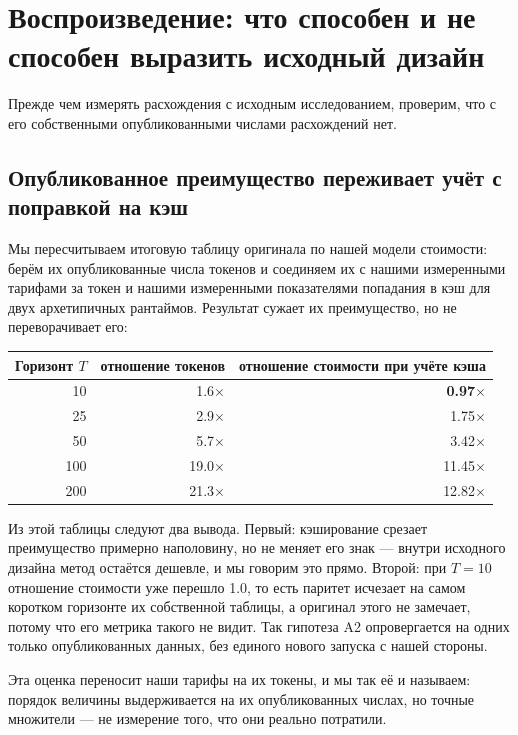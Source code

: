 \section{Воспроизведение: что способен и не способен выразить исходный дизайн}
\label{sec:repro}

Прежде чем измерять расхождения с исходным исследованием, проверим, что с
его собственными опубликованными числами расхождений нет.

\subsection{Опубликованное преимущество переживает учёт с поправкой на кэш}

Мы пересчитываем итоговую таблицу оригинала по нашей модели стоимости:
берём их опубликованные числа токенов и соединяем их с нашими измеренными
тарифами за токен и нашими измеренными показателями попадания в кэш для
двух архетипичных рантаймов. Результат сужает их преимущество, но не
переворачивает его\live:

\begin{center}
\begin{tabular}{@{}rrr@{}}
\toprule
Горизонт $T$ & отношение токенов & отношение стоимости при учёте кэша \\
\midrule
10  & 1.6$\times$  & \textbf{0.97$\times$} \\
25  & 2.9$\times$  & 1.75$\times$ \\
50  & 5.7$\times$  & 3.42$\times$ \\
100 & 19.0$\times$ & 11.45$\times$ \\
200 & 21.3$\times$ & 12.82$\times$ \\
\bottomrule
\end{tabular}
\end{center}

Из этой таблицы следуют два вывода. Первый: кэширование срезает преимущество
примерно наполовину, но не меняет его знак — внутри исходного дизайна метод
остаётся дешевле, и мы говорим это прямо. Второй: при $T{=}10$ отношение
стоимости уже перешло 1.0, то есть паритет исчезает на самом коротком
горизонте их собственной таблицы, а оригинал этого не замечает, потому что
его метрика такого не видит. Так гипотеза A2 опровергается на одних только
опубликованных данных, без единого нового запуска с нашей стороны.

Эта оценка переносит наши тарифы на их токены, и мы так её и называем:
порядок величины выдерживается на их опубликованных числах, но точные
множители — не измерение того, что они реально потратили.

